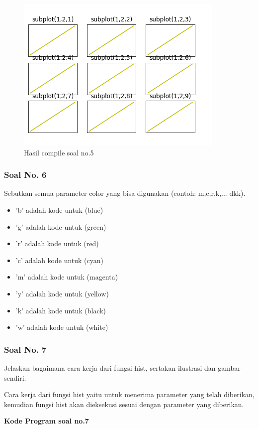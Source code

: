 \begin{figure}[H]
	\includegraphics{figures/6/1174021/5.png}
	\centering
	\caption{Hasil compile soal no.5}
\end{figure}

\subsubsection{Soal No. 6}
\hfill \break
Sebutkan semua parameter color yang bisa digunakan (contoh:  m,c,r,k,...  dkk).

\begin{itemize}
	\item 'b' adalah kode untuk (blue)
	\item 'g' adalah kode untuk (green)
	\item 'r' adalah kode untuk (red)
	\item 'c' adalah kode untuk (cyan)
	\item 'm' adalah kode untuk (magenta)
	\item 'y' adalah kode untuk (yellow)
	\item 'k' adalah kode untuk (black)
	\item 'w' adalah kode untuk (white)
\end{itemize}

\subsubsection{Soal No. 7}
\hfill \break
Jelaskan bagaimana cara kerja dari fungsi hist, sertakan ilustrasi dan gambar sendiri.

\hfill \break
Cara kerja dari fungsi hist yaitu untuk menerima parameter yang telah diberikan, kemudian fungsi hist akan dieksekusi sesuai dengan parameter yang diberikan.

\hfill \break
\textbf{Kode Program soal no.7}

